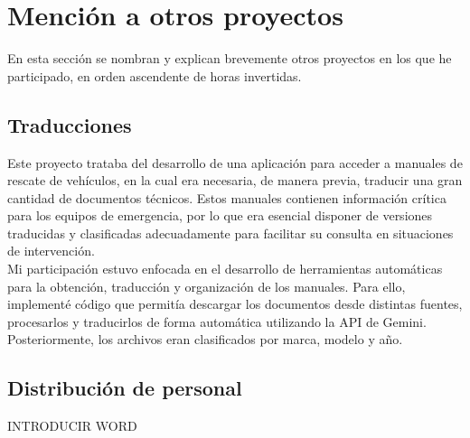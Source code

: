 \section{Mención a otros proyectos}
%
%
En esta sección se nombran y explican brevemente otros proyectos en los que he participado, en orden ascendente de horas invertidas.
%
%
\subsection{Traducciones}
%
%
Este proyecto trataba del desarrollo de una aplicación para acceder a manuales de rescate de vehículos, en la cual era necesaria, de manera previa, traducir una gran cantidad de documentos técnicos. Estos manuales contienen información crítica para los equipos de emergencia, por lo que era esencial disponer de versiones traducidas y clasificadas adecuadamente para facilitar su consulta en situaciones de intervención.\\

Mi participación estuvo enfocada en el desarrollo de herramientas automáticas para la obtención, traducción y organización de los manuales. Para ello, implementé código que permitía descargar los documentos desde distintas fuentes, procesarlos y traducirlos de forma automática utilizando la API de Gemini. Posteriormente, los archivos eran clasificados por marca, modelo y año.
%
%
\subsection{Distribución de personal}
%
%
INTRODUCIR WORD
%
%

